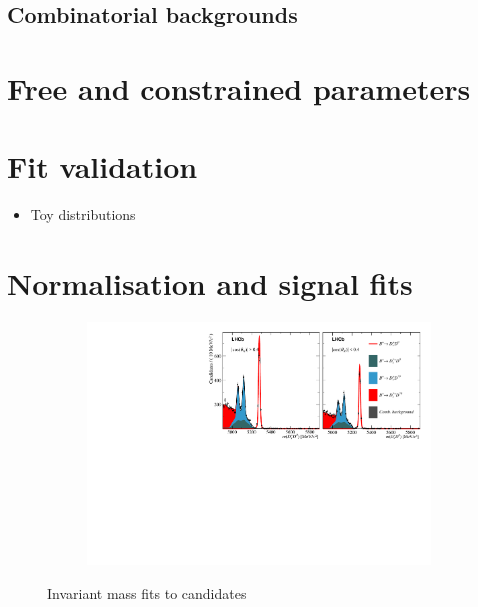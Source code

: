 \subsection{Combinatorial  backgrounds}
\label{sec:B2DsPhi_combcomps}




\section{Free and constrained parameters}

\section{Fit validation}
\label{sec:B2DsPhi_fitstrategy}

{\color{Red}
\begin{itemize}
\item Toy distributions
\end{itemize}
}

\section{Normalisation and signal fits}




\begin{figure}[!h]
    \centering
    \begin{subfigure}[t]{1.0\textwidth}
        \includegraphics[width=1.0\textwidth]{figs/Appendix_FitCategories/canvas_DsD0_merged_both_summed_splitHel_splitKKPi_s21_s21r1_s24_s26.pdf}
    \end{subfigure}
    \caption{Invariant mass fits to \decay{\Bp}{\Dsp\Dzb} candidates}
\end{figure}


